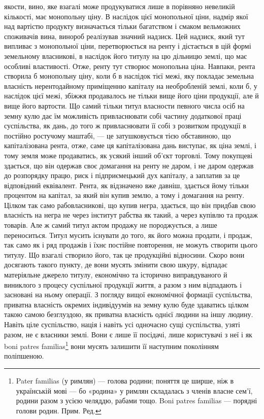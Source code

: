 якости, вино, яке взагалі може продукуватися лише в порівняно невеликій кількості,
має монопольну ціну. В наслідок цієї монопольної ціни, надмір якої над вартістю
продукту визначається тільки багатством і смаком вельможних споживачів вина,
винороб реалізував значний надзиск. Цей надзиск, який тут випливає з монопольної
ціни, перетворюється на ренту і дістається в цій формі земельному власникові, в
наслідок його титулу на цю дільницю землі, що має особливі властивості. Отже,
ренту тут створює монопольна ціна. Навпаки, рента створила б монопольну ціну,
коли б в наслідок тієї межі, яку покладає земельна власність нерентодайному приміщенню
капіталу на необробленій землі, коли б, у наслідок цієї межі, збіжжя продавалось
не тільки вище його ціни продукції, але й вище його вартости. Що самий
тільки титул власности певного числа осіб на земну кулю дає їм можливість привласнювати
собі частину додаткової праці суспільства, як дань, до того ж привласнювати
її собі з розвитком продукції в постійно ростучому маштабі, — це затушковується
тією обставиною, що капіталізована рента, отже, саме ця капіталізована
дань виступає, як ціна землі, і тому земля може продаватись, як усякий інший
об’єкт торговлі. Тому покупцеві здається, що він одержав своє домагання на ренту
не даром, і не даром одержав до розпорядку працю, риск і підприємецький дух
капіталу, а заплатив за це відповідний еквівалент. Рента, як відзначено вже
давніш, здається йому тільки процентом на капітал, за який він купив землю,
а тому і домагання на ренту. Цілком так само рабовласникові, що купив негра,
здається, що він придбав свою власність на негра не через інститут рабства
як такий, а через купівлю та продаж товарів. Але ж самий титул актом продажу
не породжується, а лише переноситься. Титул мусить існувати до того,
як його можна продати, і продаж, так само як і ряд продажів і їхнє постійне
повторення, не можуть створити цього титулу. Що взагалі створило його, так
це продукційні відносини. Скоро вони досягають такого пункту, де вони мусять
змінити свою шкуру, відпадає матеріяльне джерело титулу, економічно
та історично виправдуваного й виниклого з процесу суспільної продукції
життя, а разом з ним відпадають і засновані на ньому операції. З погляду
вищої економічної формації суспільства, приватна власність окремих індивідуумів
на земну кулю буде здаватись цілком такою самою безглуздою, як приватна
власність однієї людини на іншу людину. Навіть ціле суспільство, нація
і навіть усі одночасно сущі суспільства, узяті разом, не є власники землі. Вони є
лише її посідачі, лише користувачі з неї і як boni patres familias\footnote*{
Pater familias (у римлян) — голова родини; поняття це ширше, ніж в українській мові — бо
«родина» у римлян складалась з членів власне сем’ї, родини разом з усією челяддю, рабами тощо. Boni
patres familias — порядні голови родин. Прим. Ред.
} вони мусять
залишити її наступним поколінням поліпшеною.

